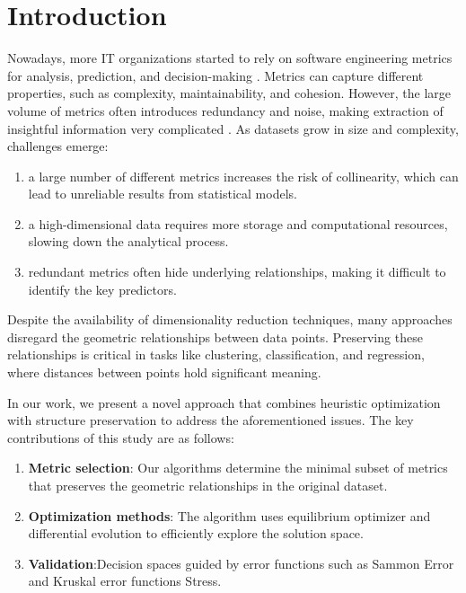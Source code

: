 \documentclass{styles/svproc}
\begin{document}
\section{Introduction}
%
Nowadays, more IT organizations started to rely on software engineering metrics for analysis, prediction, and decision-making \cite{Succi:C352.2024,Succi:J131.2023,Succi:J125.2023}. Metrics can capture different properties, such as complexity, maintainability, and cohesion. However, the large volume of metrics often introduces redundancy and noise, making extraction of insightful information very complicated \cite{Succi:J104.2018,Succi:C194.2008}. As datasets grow in size and complexity, challenges emerge:  
\begin{enumerate}
  \item a large number of different metrics increases the risk of collinearity, which can lead to unreliable results from statistical models.
  \item a high-dimensional data requires more storage and computational resources, slowing down the analytical process. 
  \item redundant metrics often hide underlying relationships, making it difficult to identify the key predictors.
\end{enumerate}  

Despite the availability of dimensionality reduction techniques, many approaches disregard the geometric relationships between data points. Preserving these relationships is critical in tasks like clustering, classification, and regression, where distances between points hold significant meaning.

In our work, we present a novel approach that combines heuristic optimization with structure preservation to address the aforementioned issues.
The key contributions of this study are as follows:
\begin{enumerate}
    \item \textbf{Metric selection}: Our algorithms determine the minimal subset of metrics that preserves the geometric relationships in the original dataset.
    \item \textbf{Optimization methods}: The algorithm uses equilibrium optimizer and differential evolution to efficiently explore the solution space.
    \item \textbf{Validation}:Decision spaces guided by error functions such as Sammon Error and Kruskal error functions Stress.
\end{enumerate} 
\end{document}
